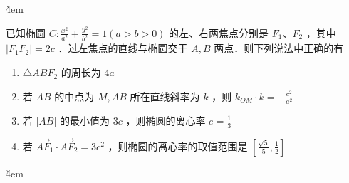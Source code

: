 \v{4em}

\begin{problem}
已知椭圆 $C: \frac{x^2}{a^2}+\frac{y^2}{b^2}=1(a>b>0)$ 的左、右两焦点分别是 $F_1 、 F_2$ ，其中 $\left|F_1 F_2\right|=2 c$ ．过左焦点的直线与椭圆交于 $A, B$ 两点．则下列说法中正确的有
\begin{enumerate}
    \item $\triangle A B F_2$ 的周长为 $4 a$
    \item 若 $A B$ 的中点为 $M, A B$ 所在直线斜率为 $k$ ，则 $k_{O M} \cdot k=-\frac{c^2}{a^2}$
    \item 若 $|A B|$ 的最小值为 $3 c$ ，则椭圆的离心率 $e=\frac{1}{3}$
    \item 若 $\overrightarrow{A F}_1 \cdot \overrightarrow{A F}_2=3 c^2$ ，则椭圆的离心率的取值范围是 $\left[\frac{\sqrt{5}}{5}, \frac{1}{2}\right]$
\end{enumerate}
\end{problem}

\v{4em}
